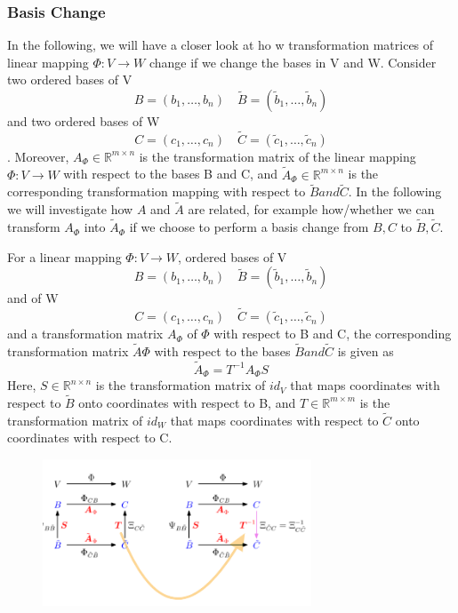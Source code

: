 \subsubsection{Basis Change}
In the following, we will have a closer look at ho w transformation matrices of linear mapping $\Phi: V \longrightarrow W$ change if we change the bases in V and W. Consider two ordered bases of V
\[ 
    B=(b_{1}, \ldots,b_{n}) \quad \tilde{B} = (\tilde{b}_{1}, \ldots,\tilde{b}_{n})
\]
and two ordered bases of W
\[ 
    C=(c_{1}, \ldots,c_{n}) \quad \tilde{C} = (\tilde{c}_{1}, \ldots,\tilde{c}_{n})
\]. Moreover, $A_\Phi \in \mathbb{R}^{m \times n}$ is the transformation matrix of the linear mapping $\Phi: V \longrightarrow W$ with respect to the bases B and C, and $\tilde{A}_\Phi \in \mathbb{R}^{m\times n}$ is the corresponding transformation mapping with respect to $\tilde{B} and \tilde{C}$. In the following we will investigate how $A$ and $\tilde{A}$ are related, for example how/whether we can transform $A_\Phi$ into $\tilde{A}_\Phi$ if we choose to perform a basis change from $B,C$ to $\tilde{B},\tilde{C}$.
\begin{theorem}
    For a linear mapping $\Phi: V \longrightarrow W$, ordered bases of V
    \[ 
        B=(b_{1}, \ldots,b_{n}) \quad \tilde{B} = (\tilde{b}_{1}, \ldots,\tilde{b}_{n})
    \]and  of W
    \[ 
        C=(c_{1}, \ldots,c_{n}) \quad \tilde{C} = (\tilde{c}_{1}, \ldots,\tilde{c}_{n}) 
    \]
    and a transformation matrix $A_\Phi$ of $\Phi$ with respect to B and C, the corresponding transformation matrix $\tilde{A}\Phi$ with respect to the bases $\tilde{B} and \tilde{C}$ is given as 
    \[ 
        \tilde{A}_\Phi = T^{-1} A_\Phi S 
    \]
    Here, $S \in \mathbb{R}^{n\times n}$ is the transformation matrix of $id_V$ that maps coordinates with respect to $\tilde{B}$ onto coordinates with respect to B, and $T \in \mathbb{R}^{m\times m}$ is the transformation matrix of $id_W$ that maps coordinates with respect to $\tilde{C}$ onto coordinates with respect to C.
    \begin{figure}[htbp]
        \centering
        \includegraphics[width=8cm]{Mathematical Background/basischange.png}
    \end{figure}
\end{theorem}


